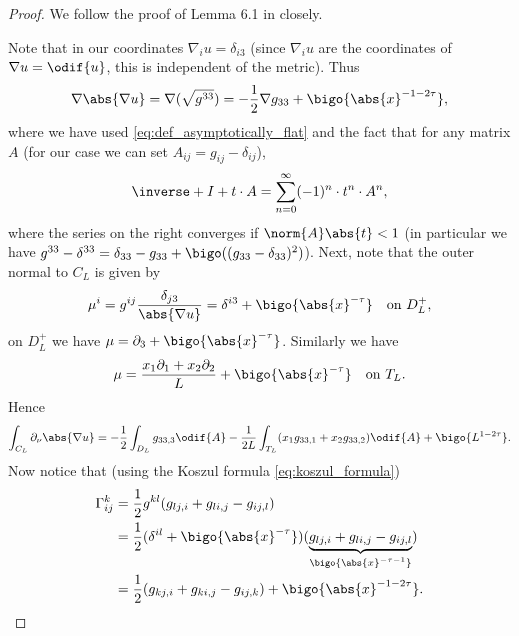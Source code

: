 \documentclass[titlepage,numbers=noenddot,oneside,%
cleardoublepage=empty,paper=a4,fontsize=11pt,%
english,%
]{scrartcl}
\begin{document}
\begin{proof}
    We follow the proof of Lemma 6.1 in \cite{brayHarmonicFunctionsMass2019} closely.

    Note that in our coordinates \( \nabla_i u=\delta_{i3} \) (since \( \nabla_i u \) are the coordinates of \( \nabla u=\odif{u} \), this is independent of the metric). Thus
    \begin{equation}
        \nabla\abs{\nabla u}=\nabla (\sqrt{g^{33}})=-\frac{1}{2}\nabla g_{33}+\bigo{\abs{x}^{-1-2\tau}},\label{eq:asymptotic_derivative_of_nabla_u_norm}
    \end{equation}
    where we have used \cref{eq:def_asymptotically_flat} and the fact that for any matrix \( A \) (for our case we can set \( A_{ij}=g_{ij}-\delta_{ij} \)),
    \begin{equation*}
        \inverse+{I+t\cdot A}=\sum_{n=0}^{\infty}(-1)^n\cdot t^n\cdot A^n,
    \end{equation*}
    where the series on the right converges if \( \norm{A}\abs{t}<1 \) (in particular we have \( g^{33}-\delta^{33}=\delta_{33}-g_{33}+\bigo((g_{33}-\delta_{33})^2) \)). Next, note that the outer normal to \( C_L \) is given by
    \begin{equation*}
        \mu^i=g^{ij}\frac{\delta_{j3}}{\abs{\nabla u}}=\delta^{i3}+\bigo{\abs{x}^{-\tau}}\quad \text{on \( D_L^+ \)},
    \end{equation*}
    \ie on \( D_L^+ \) we have \( \mu=\partial_3+\bigo{\abs{x}^{-\tau}} \). Similarly we have
    \begin{equation*}
        \mu=\frac{x_1 \partial_1+x_2 \partial_2}{L}+\bigo{\abs{x}^{-\tau}} \quad \text{on \( T_L \)}.
    \end{equation*}
    Hence
    \begin{equation*}
        \int_{C_L} \partial_{\nu}\abs{\nabla u}=-\frac{1}{2}\int_{D_L}g_{33,3}\odif{A}-\frac{1}{2L}\int_{T_L}(x_1 g_{33,1}+x_2 g_{33,2})\odif{A}+\bigo{L^{1-2\tau}}.
    \end{equation*}
    Now notice that (using the Koszul formula \cref{eq:koszul_formula})
    \begin{equation}\label{eq:asymptotic_christoffel_symbols}
        \begin{aligned}[t]
            \Gamma_{ij}^k&=\frac{1}{2}g^{kl}(g_{lj,i}+g_{li,j}-g_{ij,l})\\
            &=\frac{1}{2}(\delta^{il}+\bigo{\abs{x}^{-\tau}})(\underbrace{g_{lj,i}+g_{li,j}-g_{ij,l}}_{\bigo{\abs{x}^{-\tau-1}}})\\
            &=\frac{1}{2}(g_{kj,i}+g_{ki,j}-g_{ij,k})+\bigo{\abs{x}^{-1-2\tau}}.

\end{aligned}
\end{equation}
\end{proof}
\end{document}
